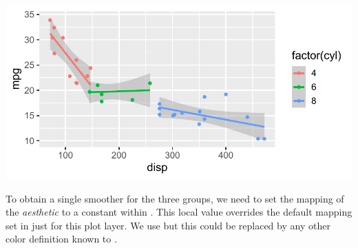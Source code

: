 \documentclass[krantz2]{krantz}\usepackage{knitr}
\begin{document}
\begin{knitrout}\footnotesize
{}\color{fgcolor}\begin{kframe}
\begin{alltt}
\hlstd{(}  \hlstd{(}     \hlstd{=}  \hlopt{+}
  \hlstd{(} \hlstd{=} \hlstd{,}   \hlopt{~}  \hlopt{+}
  \hlstd{()}
\end{alltt}
\end{kframe}

{\centering \includegraphics[width=.7\textwidth]{figure/pos-smooth-plot-04-1} 

}


\end{knitrout}

To obtain a single smoother for the three groups, we need to set the mapping of the  \emph{aesthetic} to a constant within . This local value overrides the default  mapping set in  just for this plot layer. We use  but this could be replaced by any other color definition known to \Rlang.

\begin{knitrout}\footnotesize
{}\color{fgcolor}\begin{kframe}
\begin{alltt}
\hlstd{(}  \hlstd{(}     \hlstd{=}  \hlopt{+}
  \hlstd{(} \hlstd{=} \hlstd{,}   \hlopt{~}   \hlstd{=} \hlstd{)} \hlopt{+}
  \hlstd{()}
\end{alltt}
\end{kframe}
\end{knitrout}
\end{document}
